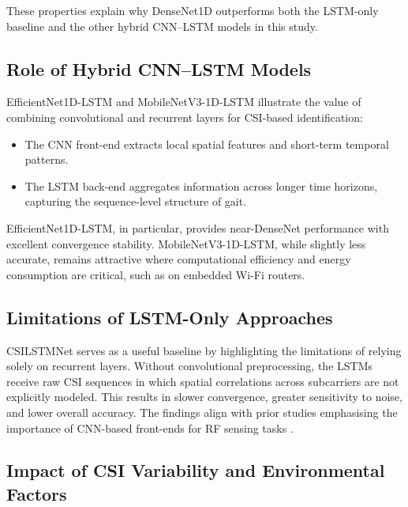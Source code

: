 These properties explain why DenseNet1D outperforms both the LSTM-only
baseline and the other hybrid CNN--LSTM models in this study.

\subsection{Role of Hybrid CNN--LSTM Models}

EfficientNet1D-LSTM and MobileNetV3-1D-LSTM illustrate the value of
combining convolutional and recurrent layers for CSI-based
identification:

\begin{itemize}
    \item The CNN front-end extracts local spatial features and short-term
    temporal patterns.

    \item The LSTM back-end aggregates information across longer time
    horizons, capturing the sequence-level structure of gait.
\end{itemize}

EfficientNet1D-LSTM, in particular, provides near-DenseNet performance
with excellent convergence stability. MobileNetV3-1D-LSTM, while slightly
less accurate, remains attractive where computational efficiency and
energy consumption are critical, such as on embedded Wi-Fi routers.

\subsection{Limitations of LSTM-Only Approaches}

CSILSTMNet serves as a useful baseline by highlighting the limitations
of relying solely on recurrent layers. Without convolutional preprocessing,
the LSTMs receive raw CSI sequences in which spatial correlations across
subcarriers are not explicitly modeled. This results in slower
convergence, greater sensitivity to noise, and lower overall accuracy.
The findings align with prior studies emphasising the importance of
CNN-based front-ends for RF sensing tasks \parencite{csibench2025}.

\subsection{Impact of CSI Variability and Environmental Factors}

